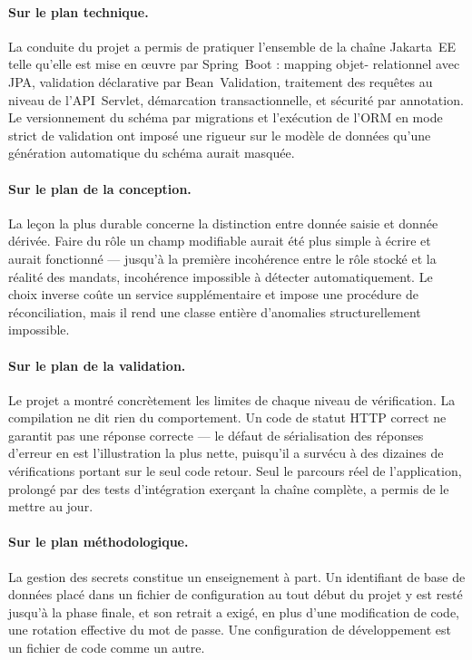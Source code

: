 \paragraph{Sur le plan technique.} La conduite du projet a permis de pratiquer l'ensemble
de la chaîne Jakarta~EE telle qu'elle est mise en œuvre par Spring~Boot : mapping objet-
relationnel avec JPA, validation déclarative par Bean~Validation, traitement des requêtes
au niveau de l'API~Servlet, démarcation transactionnelle, et sécurité par annotation. Le
versionnement du schéma par migrations et l'exécution de l'ORM en mode strict de validation
ont imposé une rigueur sur le modèle de données qu'une génération automatique du schéma
aurait masquée.

\paragraph{Sur le plan de la conception.} La leçon la plus durable concerne la distinction
entre donnée saisie et donnée dérivée. Faire du rôle un champ modifiable aurait été plus
simple à écrire et aurait fonctionné --- jusqu'à la première incohérence entre le rôle
stocké et la réalité des mandats, incohérence impossible à détecter automatiquement. Le
choix inverse coûte un service supplémentaire et impose une procédure de réconciliation,
mais il rend une classe entière d'anomalies structurellement impossible.

\paragraph{Sur le plan de la validation.} Le projet a montré concrètement les limites de
chaque niveau de vérification. La compilation ne dit rien du comportement. Un code de
statut HTTP correct ne garantit pas une réponse correcte --- le défaut de sérialisation des
réponses d'erreur en est l'illustration la plus nette, puisqu'il a survécu à des dizaines
de vérifications portant sur le seul code retour. Seul le parcours réel de l'application,
prolongé par des tests d'intégration exerçant la chaîne complète, a permis de le mettre au
jour.

\paragraph{Sur le plan méthodologique.} La gestion des secrets constitue un enseignement à
part. Un identifiant de base de données placé dans un fichier de configuration au tout
début du projet y est resté jusqu'à la phase finale, et son retrait a exigé, en plus d'une
modification de code, une rotation effective du mot de passe. Une configuration de
développement est un fichier de code comme un autre.

